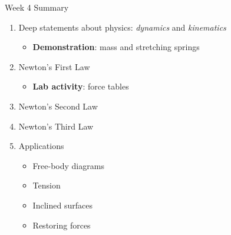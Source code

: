 \documentclass{beamer}
\begin{document}
\begin{frame}{Week 4 Summary}
\begin{enumerate}
\item Deep statements about physics: \textit{dynamics} and \textit{kinematics}
\begin{itemize}
\item \textbf{Demonstration}: mass and stretching springs
\end{itemize}
\item Newton's \alert{First Law}
\begin{itemize}
\item \textbf{Lab activity}: force tables
\end{itemize}
\item Newton's \alert{Second Law}
\item Newton's \alert{Third Law}
\item Applications
\begin{itemize}
\item Free-body diagrams
\item Tension
\item Inclined surfaces
\item Restoring forces
\end{itemize}
\end{enumerate}
\end{frame}
\end{document}
